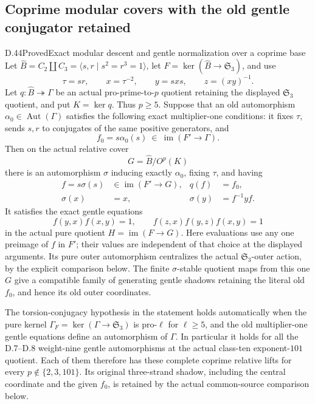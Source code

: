 \subsection{Coprime modular covers with the old gentle conjugator retained}

\begin{statement}{D.44}{Proved}{Exact modular descent and gentle normalization over a coprime base}
Let
\(\widehat B=C_2\amalg C_3=\langle s,r\mid s^2=r^3=1\rangle\),
let
\(F=\ker(\widehat B\to\mathfrak S_3)\),
and use
\[
 \tau=sr,\qquad x=\tau^{-2},\qquad y=sxs,\qquad z=(xy)^{-1}.
 \tag{D.44.1}
\]
Let \(q:\widehat B\twoheadrightarrow\Gamma\) be an actual
pro-prime-to-\(p\) quotient retaining the displayed
\(\mathfrak S_3\) quotient, and put \(K=\ker q\).
Thus \(p\geq5\).
Suppose that an old automorphism
\(\alpha_0\in\operatorname{Aut}(\Gamma)\) satisfies
the following exact multiplier-one conditions:
it fixes \(\tau\), sends \(s,r\) to conjugates of
the same positive generators, and
\[
             f_0=s\alpha_0(s)
                   \ \in\ \operatorname{im}(F'\to\Gamma).
 \tag{D.44.2}
\]
Then on the actual relative cover
\[
                    G=\widehat B/O^p(K)
 \tag{D.44.3}
\]
there is an automorphism \(\sigma\) inducing exactly
\(\alpha_0\), fixing \(\tau\), and having
\[
 \begin{aligned}
 f=s\sigma(s)&\in\operatorname{im}(F'\to G),&
 q(f)&=f_0,\\
 \sigma(x)&=x,&
 \sigma(y)&=f^{-1}yf.
 \end{aligned}
 \tag{D.44.4}
\]
It satisfies the exact gentle equations
\[
       f(y,x)f(x,y)=1,\qquad
       f(z,x)f(y,z)f(x,y)=1
 \tag{D.44.5}
\]
in the actual pure quotient \(H=\operatorname{im}(F\to G)\).
Here evaluations use any one preimage of \(f\) in \(F'\);
their values are independent of that choice at the displayed
arguments.
Its pure outer automorphism centralizes the actual
\(\mathfrak S_3\)-outer action, by the explicit
comparison below.
The finite \(\sigma\)-stable quotient maps from this one \(G\) give a
compatible family of generating gentle shadows retaining
the literal old \(f_0\), and hence its old outer coordinates.

The torsion-conjugacy hypothesis in the statement holds
automatically when the pure kernel
\(\Gamma_F=\ker(\Gamma\to\mathfrak S_3)\)
is pro-\(\ell\) for \(\ell\geq5\), and the old
multiplier-one gentle equations define an automorphism
of \(\Gamma\).
In particular it holds for all the D.7--D.8
weight-nine gentle automorphisms at the actual
class-ten exponent-\(101\) quotient.
Each of them therefore has these complete coprime
relative lifts for every \(p\notin\{2,3,101\}\).
Its original three-strand shadow, including the
central coordinate and the given \(f_0\), is retained
by the actual common-source comparison below.


\end{statement}
